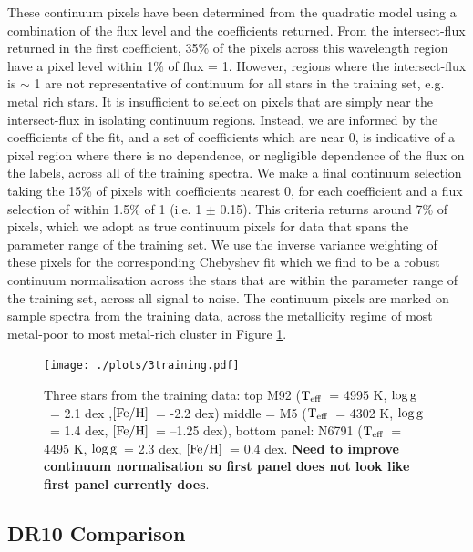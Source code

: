 \documentclass[12pt, preprint]{aastex}
\newcommand{\teff}{\mbox{$\rm T_{eff}$}}
\newcommand{\feh}{\mbox{$\rm [Fe/H]$}}
\newcommand{\logg}{\mbox{$\rm \log g$}}
\begin{document}
These continuum pixels have been determined from the quadratic model using a combination of the flux level and the coefficients returned.  From the intersect-flux returned in the first coefficient, 35\% of the pixels across this wavelength region have a pixel level within 1\% of flux = 1. However, regions where the intersect-flux is $\sim$ 1 are not representative of continuum for all stars in the training set, e.g. metal rich stars. It is insufficient to select on pixels that are simply near the intersect-flux in isolating continuum regions. Instead, we are informed by the coefficients of the fit, and a set of coefficients which are near 0, is indicative of a pixel region where there is no dependence, or negligible dependence of the flux on the labels, across all of the training spectra. We make a final continuum selection taking the 15\% of pixels with coefficients nearest 0, for each coefficient and a flux selection of within 1.5\% of 1 (i.e. 1 $\pm$ 0.15). This criteria returns around  7\% of pixels, which we adopt as true continuum pixels for data that spans the parameter range of the training set. We use the inverse variance weighting of these pixels for the corresponding Chebyshev fit which we find to be a robust continuum normalisation across the stars that are within the parameter range of the training set, across all signal to noise. The continuum pixels are marked on sample spectra from the training data, across the metallicity regime of most metal-poor to most metal-rich cluster in Figure \ref{fig:cal_feh}.




\begin{figure}[h!]
  \texttt{[image: ./plots/3training.pdf]}
\caption{Three stars from the training data: top M92 (\teff\ = 4995 K, \logg\ = 2.1 dex ,\feh\, = -2.2 dex) middle = M5 (\teff\ = 4302 K, \logg\ = 1.4 dex, \feh\ = --1.25 dex), bottom panel: N6791 (\teff\  = 4495 K, \logg\ = 2.3 dex, \feh\ = 0.4 dex. \textbf{Need to improve continuum normalisation so first panel does not look like first panel currently does}. }
\label{fig:cal_feh}
\end{figure}




\subsection{DR10 Comparison}
\end{document}
